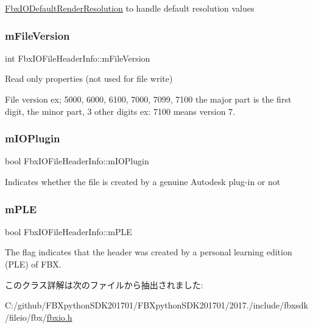 \hyperlink{class_fbx_i_o_default_render_resolution}{Fbx\+I\+O\+Default\+Render\+Resolution} to handle default resolution values 

\mbox{\label{class_fbx_i_o_file_header_info_ab344842c3191b6082e271c6768fe0eb6}} 
\subsubsection{\texorpdfstring{m\+File\+Version}{mFileVersion}}
{\footnotesize\ttfamily int Fbx\+I\+O\+File\+Header\+Info\+::m\+File\+Version}



Read only properties (not used for file write) 

File version ex; 5000, 6000, 6100, 7000, 7099, 7100 the major part is the first digit, the minor part, 3 other digits ex\+: 7100 means version 7. \mbox{\label{class_fbx_i_o_file_header_info_a76db06e54a4c3fbc382e630271d5e853}} 
\subsubsection{\texorpdfstring{m\+I\+O\+Plugin}{mIOPlugin}}
{\footnotesize\ttfamily bool Fbx\+I\+O\+File\+Header\+Info\+::m\+I\+O\+Plugin}

Indicates whether the file is created by a genuine Autodesk plug-\/in or not \mbox{\label{class_fbx_i_o_file_header_info_a831142b96de2fe8c3da6009c4f596f5c}} 
\subsubsection{\texorpdfstring{m\+P\+LE}{mPLE}}
{\footnotesize\ttfamily bool Fbx\+I\+O\+File\+Header\+Info\+::m\+P\+LE}

The flag indicates that the header was created by a personal learning edition (P\+LE) of F\+BX. 

このクラス詳解は次のファイルから抽出されました\+:\begin{DoxyCompactItemize}
\item 
C\+:/github/\+F\+B\+Xpython\+S\+D\+K201701/\+F\+B\+Xpython\+S\+D\+K201701/2017./include/fbxsdk/fileio/fbx/\hyperlink{fbxio_8h}{fbxio.\+h}\end{DoxyCompactItemize}

